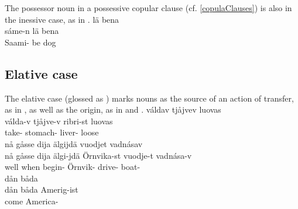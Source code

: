The possessor noun in a possessive copular clause (cf. \ref{copulaClauses}) is also in the inessive case, as in .
\ea\label{iness3}
\glll	{} lä bena\\
	sáme-n lä bena\\
	Saami- be\BS{} dog\BS{}\\\nopagebreak
{} %
\z


\subsection{Elative case}\label{elative}
The elative case (glossed as \ELATs) marks nouns as the source of an action of transfer, as in , as well as the origin, as in  and . 
\ea\label{elat1}
\glll	váldav tjåjvev  luovas\\
	válda-v tjåjve-v ribri-st luovas\\
	take- stomach- liver- loose\\\nopagebreak
{} 
\z
\ea\label{elat2a}
\glll	nå gåsse dija älgijdä  vuodjet vadnásav\\
	nå gåsse dija älgi-jdä Örnvika-st vuodje-t vadnása-v\\ %
	well when  begin- Örnvik- drive- boat-\\\nopagebreak
{} %
\z
\ea\label{elat2b}
\glll	dån båda \\
	dån båda Amerig-ist\\
	 come\BS{} America-\\\nopagebreak
{} 
\z

